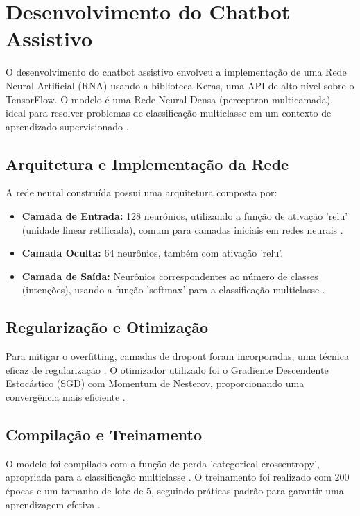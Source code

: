 \documentclass[conference]{IEEEtran}
\begin{document}

\section{Desenvolvimento do Chatbot Assistivo}

O desenvolvimento do chatbot assistivo envolveu a implementação de uma Rede Neural Artificial (RNA) 
usando a biblioteca Keras, uma API de alto nível sobre o TensorFlow. 
O modelo é uma Rede Neural Densa (perceptron multicamada), 
ideal para resolver problemas de classificação multiclasse em um contexto 
de aprendizado supervisionado \cite{Chollet2017}.

\subsection{Arquitetura e Implementação da Rede}
A rede neural construída possui uma arquitetura composta por:

\begin{itemize}
\item \textbf{Camada de Entrada:} 128 neurônios, utilizando a função de ativação 'relu' (unidade linear retificada), 
comum para camadas iniciais em redes neurais \cite{Goodfellow2016}.
\item \textbf{Camada Oculta:} 64 neurônios, também com ativação 'relu'.
\item \textbf{Camada de Saída:} Neurônios correspondentes ao número de classes (intenções), 
usando a função 'softmax' para a classificação multiclasse \cite{Bishop2006}.
\end{itemize}

\subsection{Regularização e Otimização}
Para mitigar o overfitting, camadas de dropout foram incorporadas, uma técnica eficaz de regularização \cite{Srivastava2014}. 
O otimizador utilizado foi o Gradiente Descendente Estocástico (SGD) com Momentum de Nesterov, 
proporcionando uma convergência mais eficiente \cite{Sutskever2013}.

\subsection{Compilação e Treinamento}
O modelo foi compilado com a função de perda 'categorical crossentropy', 
apropriada para a classificação multiclasse \cite{Goodfellow2016}. 
O treinamento foi realizado com 200 épocas e um tamanho de lote de 5, 
seguindo práticas padrão para garantir uma aprendizagem efetiva \cite{Bengio2012}.
\end{document}
